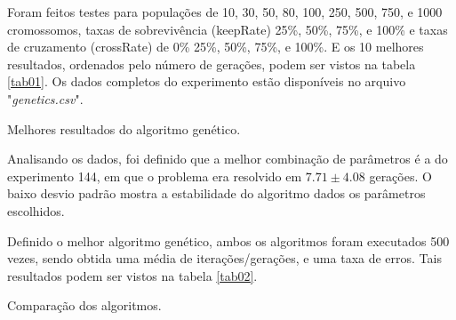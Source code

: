 \documentclass[conference]{IEEEtran}
\begin{document}
	Foram feitos testes para populações de 10, 30, 50, 80, 100, 250, 500, 750, e 1000 cromossomos, taxas de sobrevivência (keepRate) 25\%, 50\%, 75\%, e 100\% e taxas de cruzamento (crossRate) de 0\% 25\%, 50\%, 75\%, e 100\%. E os 10 melhores resultados, ordenados pelo número de gerações, podem ser vistos na tabela \ref{tab01}. Os dados completos do experimento estão disponíveis no arquivo "\textit{genetics.csv}".
	
		
		\begin{table}[h!]
			\begin{center}
				\caption{Melhores resultados do algoritmo genético.}
				\label{tab01}
			\end{center}
		\end{table}
	
	Analisando os dados, foi definido que a melhor combinação de parâmetros é a do experimento 144, em que o problema era resolvido em $7.71 \pm 4.08$ gerações. O baixo desvio padrão mostra a estabilidade do algoritmo dados os parâmetros escolhidos.
	
	Definido o melhor algoritmo genético, ambos os algoritmos foram executados 500 vezes, sendo obtida uma
	média de iterações/gerações, e uma taxa de erros. Tais resultados podem ser vistos na tabela \ref{tab02}.
	
	\begin{table}[h!]
		\begin{center}
			\caption{Comparação dos algoritmos.}
			\label{tab02}
		\end{center}
	\end{table}
\end{document}
